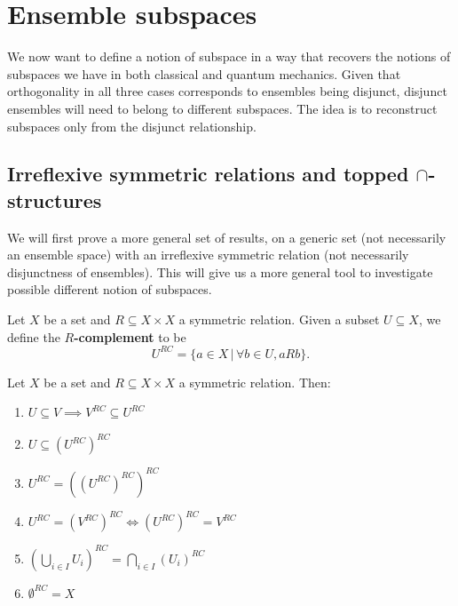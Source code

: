 \section{Ensemble subspaces}

We now want to define a notion of subspace in a way that recovers the notions of subspaces we have in both classical and quantum mechanics. Given that orthogonality in all three cases corresponds to ensembles being disjunct, disjunct ensembles will need to belong to different subspaces. The idea is to reconstruct subspaces only from the disjunct relationship.

\subsection{Irreflexive symmetric relations and topped $\cap$-structures}

We will first prove a more general set of results, on a generic set (not necessarily an ensemble space) with an irreflexive symmetric relation (not necessarily disjunctness of ensembles). This will give us a more general tool to investigate possible different notion of subspaces.

\begin{defn}
	Let $X$ be a set and $R \subseteq X \times X$ a symmetric relation. Given a subset $U \subseteq X$, we define the \textbf{$R$-complement} to be
	$$ U^{RC} = \{ a \in X \, | \, \forall b \in U, aRb  \}. $$
\end{defn}

\begin{prop}\label{pm_es_rComplProps}
	Let $X$ be a set and $R \subseteq X \times X$ a symmetric relation. Then:
	\begin{enumerate}
		\item $U \subseteq V \implies V^{RC} \subseteq U^{RC}$
		\item $U \subseteq (U^{RC})^{RC}$
		\item $U^{RC} = ((U^{RC})^{RC})^{RC}$
		\item $U^{RC} = (V^{RC})^{RC} \iff (U^{RC})^{RC} = V^{RC}$
		\item $(\bigcup_{i \in I} U_i )^{RC} = \bigcap_{i \in I} (U_i)^{RC}$
		\item $\emptyset^{RC} = X$
	\end{enumerate}
\end{prop}

